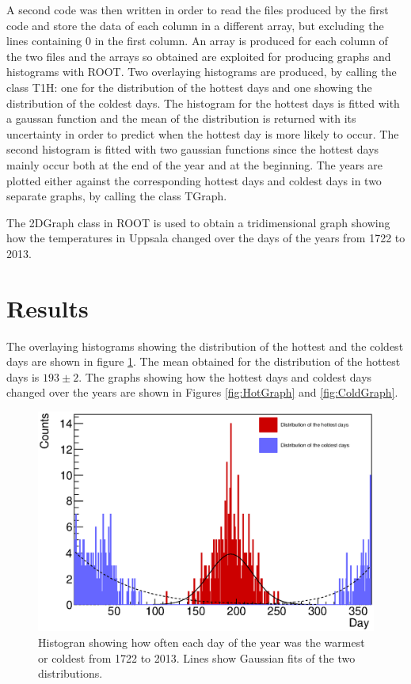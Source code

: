 A second code was then written in order to read the files produced by the first code and store the data of each column in a different 
array, but excluding the lines containing $0$ in the first column. An array is produced for each column of the two files and the 
arrays so obtained are exploited for producing graphs and histograms with ROOT.
Two overlaying histograms are produced, by calling the class T1H: one for the distribution of the hottest days and one showing the distribution of the 
coldest days. The histogram for the hottest days is fitted with a gaussan function and the mean of the distribution is returned with its 
uncertainty in order to predict when the hottest day is more likely to occur. The second histogram is fitted with 
two gaussian functions since the hottest days mainly occur both at the end of the year and at the beginning. The years are
plotted either against the corresponding hottest days and coldest days in two separate graphs, by calling the class TGraph. 

The 2DGraph class in ROOT is used to obtain a tridimensional graph showing how the temperatures in Uppsala changed over the days of 
the years from 1722 to 2013.


\section{Results}\label{sec:Results}

The overlaying histograms showing the distribution of the hottest and the coldest days are shown in figure \ref{fig:HotColdHist}.
The mean obtained for the distribution of the hottest days is $193 \pm 2$. The graphs showing how the hottest days and coldest days 
changed over the years are shown in Figures  \ref{fig:HotGraph} and \ref{fig:ColdGraph}. 


\begin{figure}[h]
\begin{center}
\includegraphics[width=12cm]{HottestColdest.eps}
\caption{Histogran showing how often each day of the year was the warmest or coldest from 1722 to 2013. Lines 
show Gaussian fits of the two distributions.}
\label{fig:HotColdHist}
\end{center}
\end{figure}


